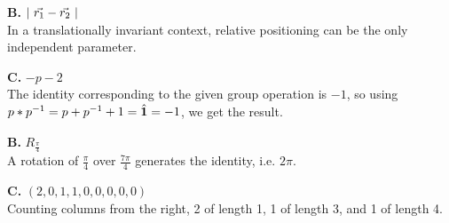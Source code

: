 \begin{alphaparts}
    \questionpart
    \textbf{B.} $\absolutevalue{~\vec{r_1} - \vec{r_2}~}$ \\
    In a translationally invariant context, relative positioning 
    can be the only independent parameter.

    \questionpart
    \textbf{C.} $-p - 2$ \\
    The identity corresponding to the given group operation is $-1$,
    so using $p * p^{-1} = p + p^{-1} +1 = \hat{\textbf{1}} = -1$, we get the 
    result.

    \questionpart
    \textbf{B.} $R_{\frac{\pi}{4}}$ \\
    A rotation of $\frac{\pi}{4}$ over $\frac{7\pi}{4}$ generates 
    the identity, i.e. $2\pi$.

    \questionpart
    \textbf{C.} $(2, 0, 1, 1, 0, 0, 0, 0, 0)$ \\
    Counting columns from the right, 2 of length 1, 1 of length 3,
    and 1 of length 4.

\end{alphaparts}